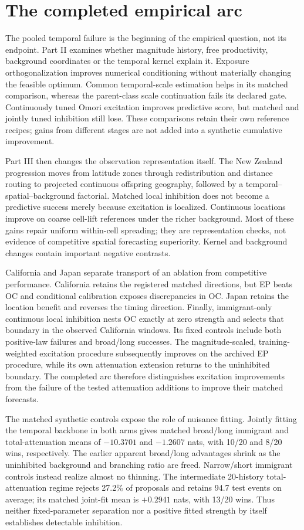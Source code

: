 \section{The completed empirical arc}

The pooled temporal failure is the beginning of the empirical question, not its endpoint. Part II examines whether magnitude history, free productivity, background coordinates or the temporal kernel explain it. Exposure orthogonalization improves numerical conditioning without materially changing the feasible optimum. Common temporal-scale estimation helps in its matched comparison, whereas the parent-class scale continuation fails its declared gate. Continuously tuned Omori excitation improves predictive score, but matched and jointly tuned inhibition still lose. These comparisons retain their own reference recipes; gains from different stages are not added into a synthetic cumulative improvement.

Part III then changes the observation representation itself. The New Zealand progression moves from latitude zones through redistribution and distance routing to projected continuous offspring geography, followed by a temporal--spatial--background factorial. Matched local inhibition does not become a predictive success merely because excitation is localized. Continuous locations improve on coarse cell-lift references under the richer background. Most of these gains repair uniform within-cell spreading; they are representation checks, not evidence of competitive spatial forecasting superiority. Kernel and background changes contain important negative contrasts.

California and Japan separate transport of an ablation from competitive performance. California retains the registered matched directions, but EP beats OC and conditional calibration exposes discrepancies in OC. Japan retains the location benefit and reverses the timing direction. Finally, immigrant-only continuous local inhibition nests OC exactly at zero strength and selects that boundary in the observed California windows. Its fixed controls include both positive-law failures and broad/long successes. The magnitude-scaled, training-weighted excitation procedure subsequently improves on the archived EP procedure, while its own attenuation extension returns to the uninhibited boundary. The completed arc therefore distinguishes excitation improvements from the failure of the tested attenuation additions to improve their matched forecasts.

The matched synthetic controls expose the role of nuisance fitting. Jointly fitting the temporal backbone in both arms gives matched broad/long immigrant and total-attenuation means of $-10.3701$ and $-1.2607$ nats, with 10/20 and 8/20 wins, respectively. The earlier apparent broad/long advantages shrink as the uninhibited background and branching ratio are freed. Narrow/short immigrant controls instead realize almost no thinning. The intermediate 20-history total-attenuation regime rejects 27.2\% of proposals and retains 94.7 test events on average; its matched joint-fit mean is $+0.2941$ nats, with 13/20 wins. Thus neither fixed-parameter separation nor a positive fitted strength by itself establishes detectable inhibition.

